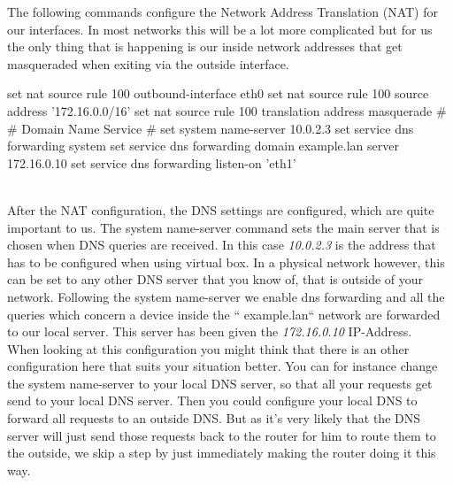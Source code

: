 The following commands configure the Network Address Translation (NAT) for our interfaces. In most networks this will be a lot more complicated but for us the only thing that is happening is our inside network addresses that get masqueraded when exiting via the outside interface.
\begin{cisco}[title=NAT configuration]
set nat source rule 100 outbound-interface eth0
set nat source rule 100 source address '172.16.0.0/16'
set nat source rule 100 translation address masquerade
#
# Domain Name Service
#
set system name-server 10.0.2.3
set service dns forwarding system
set service dns forwarding domain example.lan server 172.16.0.10
set service dns forwarding listen-on 'eth1'
\end{cisco}\\
After the NAT configuration, the DNS settings are configured, which are quite important to us. The system name-server command sets the main server that is chosen when DNS queries are received. In this case \textit{10.0.2.3} is the address that has to be configured when using virtual box. In a physical network however, this can be set to any other DNS server that you know of, that is outside of your network. Following the system name-server we enable dns forwarding and all the queries which concern a device inside the `` example.lan`` network are forwarded to our local server. This server has been given the \textit{172.16.0.10} IP-Address.\\

When looking at this configuration you might think that there is an other configuration here that suits your situation better. You can for instance change the system name-server to your local DNS server, so that all your requests get send to your local DNS server. Then you could configure your local DNS to forward all requests to an outside DNS. But as it's very likely that the DNS server will just send those requests back to the router for him to route them to the outside, we skip a step by just immediately making the router doing it this way. \\

